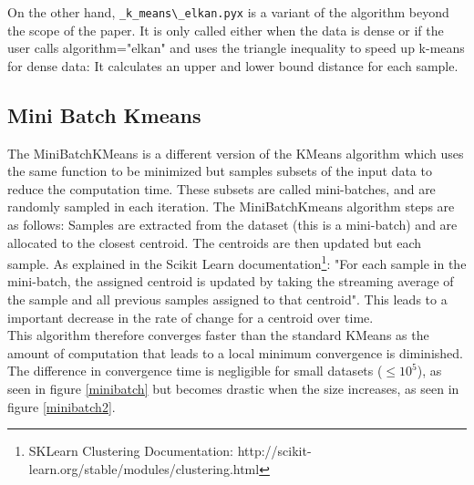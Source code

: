 \documentclass[11pt]{article}
\begin{document}
\noindent On the other hand, \verb|_k_means\_elkan.pyx| is a variant of the algorithm beyond the scope of the paper. It is only called either when the data is dense or if the user calls algorithm="elkan" and uses the triangle inequality to speed up k-means for dense data: It calculates an upper and lower bound distance for each sample. 

\subsection*{Mini Batch Kmeans}
The MiniBatchKMeans is a different version of the KMeans algorithm which uses the same function to be minimized but samples subsets of the input data to reduce the computation time. These subsets are called mini-batches, and are randomly sampled in each iteration. The MiniBatchKmeans algorithm steps are as follows: Samples are extracted from the dataset (this is a mini-batch) and are allocated to the closest centroid. The centroids are then updated but each sample. As explained in the Scikit Learn documentation\footnote{SKLearn Clustering Documentation: http://scikit-learn.org/stable/modules/clustering.html}:
"For each sample in the mini-batch, the assigned centroid is updated by taking the streaming average of the sample and all previous samples assigned to that centroid". 
This leads to a important decrease in the rate of change for a centroid over time.\\

\noindent This algorithm therefore converges faster than the standard KMeans as the amount of computation that leads to a local minimum convergence is diminished. The difference in convergence time is negligible for small datasets ($\leq 10^5$), as seen in figure \ref{minibatch} but becomes drastic when the size increases, as seen in figure \ref{minibatch2}.\\
\end{document}
